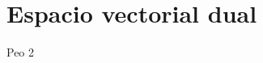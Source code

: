 \documentclass[../main.tex]{subfiles}
\begin{document}
\section{Espacio vectorial dual}
Peo 2
 
\end{document}
